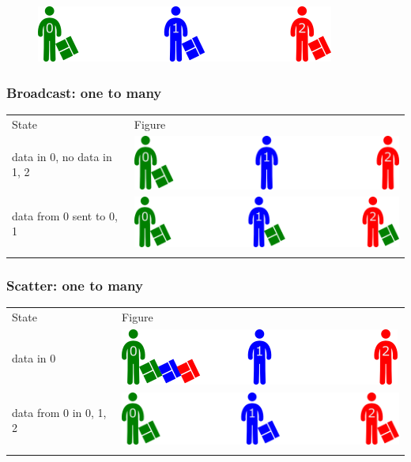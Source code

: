 \begin{figure}[htbp]
\centering
\includegraphics{06MPI/figures/collective.png}
\end{figure}

\subsubsection{Broadcast: one to many}\label{broadcast-one-to-many}

\begin{longtable}[c]{@{}ll@{}}
\toprule\addlinespace
State & Figure
\\\addlinespace
\midrule\endhead
data in 0, no data in 1, 2 &
\includegraphics{06MPI/figures/broadcast0.png}
\\\addlinespace
data from 0 sent to 0, 1 &
\includegraphics{06MPI/figures/broadcast1.png}
\\\addlinespace
\bottomrule
\end{longtable}

\subsubsection{Scatter: one to many}\label{scatter-one-to-many}

\begin{longtable}[c]{@{}ll@{}}
\toprule\addlinespace
State & Figure
\\\addlinespace
\midrule\endhead
data in 0 & \includegraphics{06MPI/figures/gather1.png}
\\\addlinespace
data from 0 in 0, 1, 2 & \includegraphics{06MPI/figures/collective.png}
\\\addlinespace
\bottomrule
\end{longtable}

